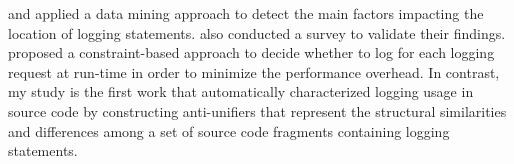 \citet{fu2014developers} and \citet{zhu2015learning} applied a data mining approach to detect the main factors impacting the location of logging statements. \citet{fu2014developers} also conducted a survey to validate their findings. \citet{ding2015log2} proposed a constraint-based approach to decide whether to log for each logging request at run-time in order to minimize the performance overhead. In contrast, my study is the first work that automatically characterized logging usage in source code by constructing anti-unifiers that represent the structural similarities and differences among a set of source code fragments containing logging statements.










